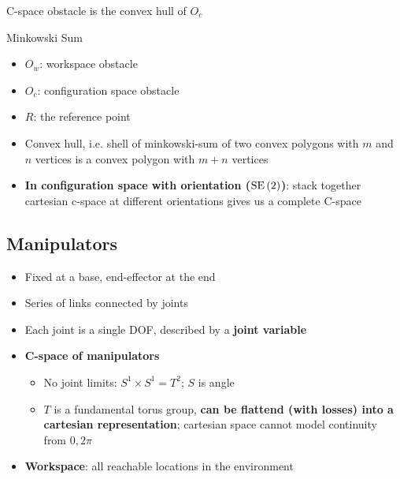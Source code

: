   C-space obstacle is the convex hull of $ O_{c} $

  \begin{algorithm}[H]
    \caption{Minkowski Sum}

  \end{algorithm}

  \begin{itemize}
    \item $ O_{w} $: workspace obstacle
    \item $ O_{c} $: configuration space obstacle
    \item $ R $: the reference point
    \item Convex hull, i.e. shell of \Gls{minkowski-sum} of two convex polygons
    with $ m $ and $ n $ vertices is a convex polygon with $ m + n $ vertices
    \item \textbf{In configuration space with orientation ($ \operatorname{SE}\left( 2 \right) $)}:
    stack together cartesian c-space at different orientations gives us a
    complete C-space
  \end{itemize}

\subsection{Manipulators}

  \begin{itemize}
    \item Fixed at a base, end-effector at the end
    \item Series of links connected by joints
    \item Each joint is a single DOF, described by a \textbf{joint variable}
    \item \textbf{C-space of manipulators}
    \begin{itemize}
      \item No joint limits: $ S^{1} \times S^{1} = T^{2} $; $ S $ is angle
      \item $ T $ is a fundamental torus group, \textbf{can be flattend (with losses)
      into a cartesian representation}; cartesian space cannot model continuity
      from $ 0, 2\pi $
    \end{itemize}

    \item \textbf{Workspace}: all reachable locations in the environment
  \end{itemize}
